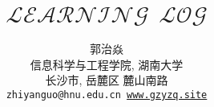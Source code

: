 \documentclass{article}
\title{$\mathcal{LEARNING\ \ LOG}$}
\author{
  郭治焱 \\
  信息科学与工程学院, 湖南大学\\
  长沙市, 岳麓区 麓山南路 \\
  \texttt{zhiyanguo@hnu.edu.cn \hspace{12pt} \href{www.zyzq.site}{www.gzyzq.site}}
}
\begin{document}
\maketitle





\vspace{\baselineskip}
\vspace{\baselineskip}
\vspace{\baselineskip}






% 

% 


% 


% 
\end{document}
